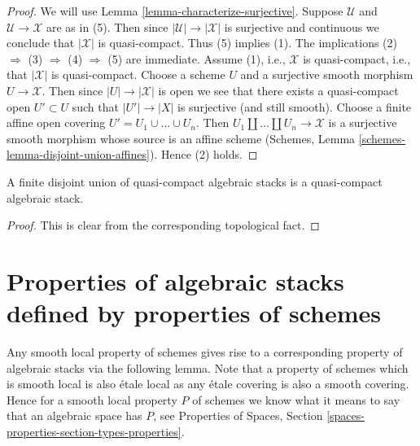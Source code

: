 \begin{proof}
We will use
Lemma \ref{lemma-characterize-surjective}.
Suppose $\mathcal{U}$ and $\mathcal{U} \to \mathcal{X}$ are as in (5).
Then since $|\mathcal{U}| \to |\mathcal{X}|$ is surjective and
continuous we conclude that $|\mathcal{X}|$ is quasi-compact.
Thus (5) implies (1). The implications
(2) $\Rightarrow$ (3) $\Rightarrow$ (4) $\Rightarrow$ (5)
are immediate. Assume (1), i.e., $\mathcal{X}$ is quasi-compact, i.e., that
$|\mathcal{X}|$ is quasi-compact. Choose a scheme $U$ and a surjective
smooth morphism $U \to \mathcal{X}$. Then since $|U| \to |\mathcal{X}|$
is open we see that there exists a quasi-compact open $U' \subset U$
such that $|U'| \to |X|$ is surjective (and still smooth).
Choose a finite affine open covering $U' = U_1 \cup \ldots \cup U_n$.
Then $U_1 \amalg \ldots \amalg U_n \to \mathcal{X}$
is a surjective smooth morphism whose source is an
affine scheme (Schemes, Lemma \ref{schemes-lemma-disjoint-union-affines}).
Hence (2) holds.
\end{proof}

\begin{lemma}
\label{lemma-finite-disjoint-quasi-compact}
A finite disjoint union of quasi-compact algebraic stacks is
a quasi-compact algebraic stack.
\end{lemma}

\begin{proof}
This is clear from the corresponding topological fact.
\end{proof}


\section{Properties of algebraic stacks defined by properties of schemes}
\label{section-types-properties}

\noindent
Any smooth local property of schemes gives rise to a corresponding
property of algebraic stacks via the following lemma. Note that a
property of schemes which is smooth local is also \'etale local
as any \'etale covering is also a smooth covering. Hence for a smooth
local property $P$ of schemes we know what it means to say that
an algebraic space has $P$, see
Properties of Spaces, Section \ref{spaces-properties-section-types-properties}.

